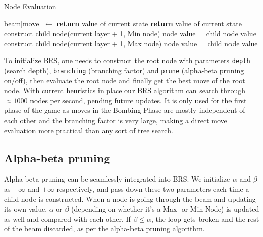 \documentclass[a4paper,12pt]{article}
\begin{document}
\begin{algorithm}[H]
\caption{Node Evaluation}
\begin{algorithmic}
\Statex
\State beam[move] $\gets$ 
\Statex
{}
    \State \textbf{return} value of current state
\Statex
{}
    \State \textbf{return} value of current state
\Statex
{}
        \State construct child node(current layer + 1, Min node)
            \State node value = child node value
        \EndIf
    \EndFor
\Statex
{}
        \State construct child node(current layer + 1, Max node)
            \State node value = child node value
        \EndIf
    \EndFor
\EndIf
\EndFunction
\end{algorithmic}
\end{algorithm}

To initialize BRS, one needs to construct the root node with parameters \texttt{depth} (search depth), \texttt{branching} (branching factor) and \texttt{prune} (alpha-beta pruning on/off), then evaluate the root node and finally get the best move of the root node. With current heuristics in place our BRS algorithm can search through $\approx 1000$ nodes per second, pending future updates. It is only used for the first phase of the game as moves in the Bombing Phase are mostly independent of each other and the branching factor is very large, making a direct move evaluation more practical than any sort of tree search.

\subsection{Alpha-beta pruning}
Alpha-beta pruning can be seamlessly integrated into BRS. We initialize $\alpha$ and $\beta$ as $-\infty$ and $+\infty$ respectively, and pass down these two parameters each time a child node is constructed. When a node is going through the beam and updating its own value, $\alpha$ or $\beta$ (depending on whether it's a Max- or Min-Node) is updated as well and compared with each other. If $\beta \leq \alpha$, the loop gets broken and the rest of the beam discarded, as per the alpha-beta pruning algorithm.
\end{document}
